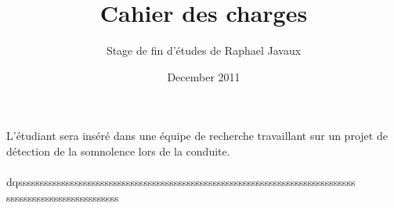 \documentclass[a4paper,12pt]{report}
\title{Cahier des charges}
\author{Stage de fin d'études de Raphael Javaux}
\date{December 2011}
\begin{document}
\maketitle 

\paragraph{}
L'étudiant sera inséré dans une équipe de recherche travaillant sur un projet
de détection de la somnolence lors de la conduite.

\paragraph{}
dqssssssssssssssssssssssssssssssssssssssssssssssssssssssssssssssssssssssssssssss
ssssssssssssssssssssssssss
\end{document}
